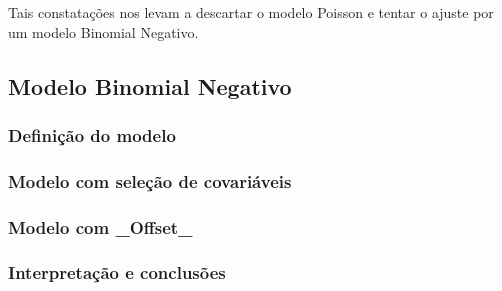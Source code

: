 \documentclass[12pt,a4paper]{article}\usepackage[]{graphicx}\usepackage[]{color}
\begin{document}
Tais constatações nos levam a descartar o modelo Poisson e tentar o ajuste por um modelo Binomial Negativo.

\subsection{\textbf{Modelo Binomial Negativo}}

\subsubsection{\textbf{Definição do modelo}}

\subsubsection{\textbf{Modelo com seleção de covariáveis}}

\subsubsection{\textbf{Modelo com \_Offset\_}}

\subsubsection{\textbf{Interpretação e conclusões}}
\end{document}
